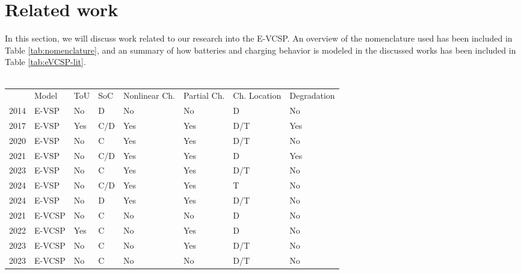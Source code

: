 \documentclass[]{article}
\begin{document}
\section{Related work}
In this section, we will discuss work related to our research into the E-VCSP. An overview of the nomenclature used has been included in Table \ref{tab:nomenclature}, and an summary of how batteries and charging behavior is modeled in the discussed works has been included in Table \ref{tab:eVCSP-lit}. \\\\
\begin{table}[]
  \centering
  \begin{tabular}{clllllll}
    \toprule
                                     & Model   & ToU & SoC & Nonlinear Ch. & Partial Ch. & Ch. Location & Degradation \\
    \cmidrule(lr){2-8}
    \citet{Li2014} 2014               & E-VSP   & No  & D   & No            & No          & D            & No          \\
    \citet{vanKootenNiekerk2017} 2017 & E-VSP   & Yes & C/D & Yes           & Yes         & D/T          & Yes         \\
    \citet{Olsen2020} 2020            & E-VSP   & No  & C   & Yes           & Yes         & D/T          & No          \\
    \citet{Zhang2021} 2021            & E-VSP   & No  & C/D & Yes           & Yes         & D            & Yes         \\
    \citet{Parmentier2023} 2023       & E-VSP   & No  & C   & Yes           & Yes         & D/T          & No          \\
    \citet{Pulyassary2024} 2024       & E-VSP   & No  & C/D & Yes           & Yes         & T            & No          \\
    \citet{deVos2024} 2024            & E-VSP   & No  & D   & Yes           & Yes         & D/T          & No          \\
    \addlinespace[0.4em]
    \citet{Perumal2021} 2021          & E-VCSP  & No  & C   & No            & No          & D            & No          \\
    \citet{Wang2022} 2022             & E-VCSP  & Yes & C   & No            & Yes         & D            & No          \\
    \citet{Sistig2023} 2023           & E-VCSP  & No  & C   & No            & Yes         & D/T          & No          \\
    \citet{Shen2023} 2023             & E-VCSP  & No  & C   & No            & No          & D/T          & No          \\

\end{tabular}
\end{table}
\end{document}
